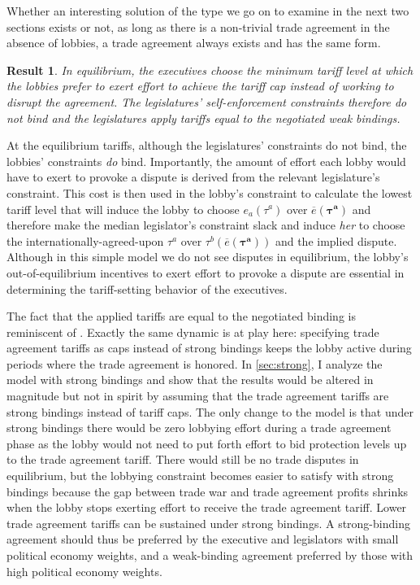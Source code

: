 \documentclass[authoryear, review]{elsarticle}
\newtheorem{result}{Result}
\newcommand{\ov}{\overline}
\newcommand{\bta}{\bm{\tau^a}}
\begin{document}
Whether an interesting solution of the type we go on to examine in the next two sections exists or not, as long as there is a non-trivial trade agreement in the absence of lobbies, a trade agreement always exists and has the same form.				

\begin{result}
  In equilibrium, the executives choose the minimum tariff level at which the lobbies prefer to exert effort to achieve the tariff cap instead of working to disrupt the agreement. The legislatures' self-enforcement constraints therefore do not bind and the legislatures apply tariffs equal to the negotiated weak bindings.
  \label{res:eqm}
\end{result}
At the equilibrium tariffs, although the legislatures' constraints do not bind, the lobbies' constraints \textit{do} bind. Importantly, the amount of effort each lobby would have to exert to provoke a dispute is derived from the relevant legislature's constraint. This cost is then used in the lobby's constraint to calculate the lowest tariff level that will induce the lobby to choose $e_a(\tau^a)$ over $\ov{e}(\bta)$ and therefore make the median legislator's constraint slack and induce \textit{her} to choose the internationally-agreed-upon $\tau^a$ over $\tau^b(\ov{e}(\bta))$ and the implied dispute. Although in this simple model we do not see disputes in equilibrium, the lobby's out-of-equilibrium incentives to exert effort to provoke a dispute are essential in determining the tariff-setting behavior of the executives.

The fact that the applied tariffs are equal to the negotiated binding is reminiscent of \citet{mrc2007}. Exactly the same dynamic is at play here: specifying trade agreement tariffs as caps instead of strong bindings keeps the lobby active during periods where the trade agreement is honored. In \ref{sec:strong}, I analyze the model with strong bindings and show that the results would be altered in magnitude but not in spirit by assuming that the trade agreement tariffs are strong bindings instead of tariff caps. The only change to the model is that under strong bindings there would be zero lobbying effort during a trade agreement phase as the lobby would not need to put forth effort to bid protection levels up to the trade agreement tariff. There would still be no trade disputes in equilibrium, but the lobbying constraint becomes easier to satisfy with strong bindings because the gap between trade war and trade agreement profits shrinks when the lobby stops exerting effort to receive the trade agreement tariff. Lower trade agreement tariffs can be sustained under strong bindings. A strong-binding agreement should thus be preferred by the executive and legislators with small political economy weights, and a weak-binding agreement preferred by those with high political economy weights.
\end{document}
